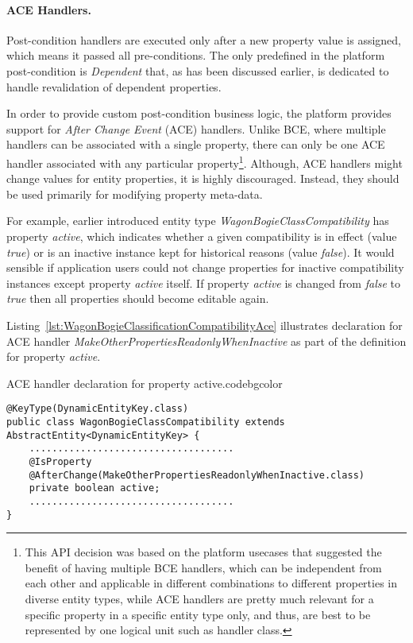   \paragraph*{ACE Handlers.}

  Post-condition handlers are executed only after a new property value is assigned, which means it passed all pre-conditions.
  The only predefined in the platform post-condition is \emph{Dependent} that, as has been discussed earlier, is dedicated to handle revalidation of dependent properties.
  
  In order to provide custom post-condition business logic, the platform provides support for \emph{After Change Event} (ACE) handlers.
  Unlike BCE, where multiple handlers can be associated with a single property, there can only be one ACE handler associated with any particular property\footnote{This API decision was based on the platform usecases that suggested the benefit of having multiple BCE handlers, which can be independent from each other and applicable in different combinations to different properties in diverse entity types, while ACE handlers are pretty much relevant for a specific property in a specific entity type only, and thus, are best to be represented by one logical unit such as handler class.}.
  Although, ACE handlers might change values for entity properties, it is highly discouraged.
  Instead, they should be used primarily for modifying property meta-data.
  
  For example, earlier introduced entity type \emph{WagonBogieClassCompatibility} has property \emph{active}, which indicates whether a given compatibility is in effect (value \emph{true}) or is an inactive instance kept for historical reasons (value \emph{false}).
  It would sensible if application users could not change properties for inactive compatibility instances except property \emph{active} itself.
  If property \emph{active} is changed from \emph{false} to \emph{true} then all properties should become editable again.
  
  Listing~\ref{lst:WagonBogieClassificationCompatibilityAce} illustrates declaration for ACE handler \emph{MakeOtherPropertiesReadonlyWhenInactive} as part of the definition for property \emph{active}.

  \begin{code}{ACE handler declaration for property active.}{\label{lst:WagonBogieClassificationCompatibilityAce}}{codebgcolor}
    \begin{lstlisting}
@KeyType(DynamicEntityKey.class)
public class WagonBogieClassCompatibility extends AbstractEntity<DynamicEntityKey> {
    ....................................
    @IsProperty
    @AfterChange(MakeOtherPropertiesReadonlyWhenInactive.class)
    private boolean active;
    ....................................
}
    \end{lstlisting}
  \end{code}


